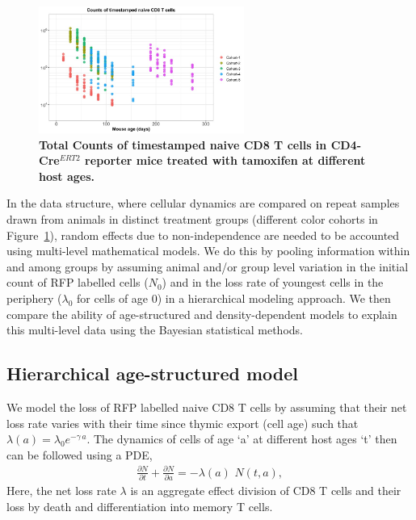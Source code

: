 \documentclass[12pt]{article} %
\begin{document}
\begin{figure}
\centering
\vspace*{-4mm}
     \includegraphics[width=0.60\textwidth]{tmstmp_data.jpeg}
      \caption{\textbf{Total Counts of timestamped naive CD8 T cells in CD4-Cre$^{ERT2}$ reporter mice treated with tamoxifen at different host ages.}}
   \label{fig:timestamp_data}
  \vspace*{-4mm}
 \end{figure}

In the data structure, where cellular dynamics are compared on repeat samples drawn from animals in distinct treatment groups (different color cohorts in Figure~\ref{fig:timestamp_data}), random effects due to non-independence are needed to be accounted using multi-level mathematical models.
We do this by pooling information within and among groups by assuming animal and/or group level variation in the initial count of RFP labelled cells ($N_{0}$) and in the loss rate of youngest cells in the periphery ($\lambda_{0}$ for cells of age 0) in a hierarchical modeling approach. 
We then compare the ability of age-structured and density-dependent models to explain this multi-level data using the Bayesian statistical methods.

\subsection*{Hierarchical age-structured model}
We model the loss of RFP labelled naive CD8 T cells by assuming that their net loss rate varies with their time since thymic export (cell age) such that $\lambda(a) = \lambda_{0} e^{-\gamma\,a}$.
The dynamics of cells of age `a' at different host ages `t' then can be followed using a PDE,
\begin{equation}
\begin{aligned}
\frac{\partial N}{\partial t} + \frac{\partial N}{\partial a} = -\lambda(a) \,\, N(t, a), 
\end{aligned}
\label{eq:pde-asm}
\end{equation}
Here, the net loss rate $\lambda$ is an aggregate effect division of CD8 T cells and their loss by death and differentiation into memory T cells.
\end{document}

